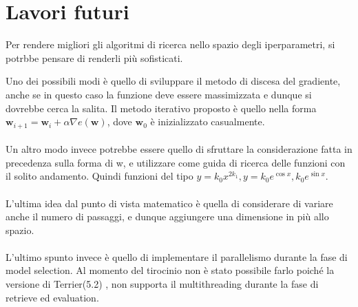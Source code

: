\section{Lavori futuri}
Per rendere migliori gli algoritmi di ricerca nello spazio degli iperparametri, si
potrbbe pensare di renderli più sofisticati.

Uno dei possibili modi è quello di sviluppare il metodo
di discesa del gradiente, anche se in questo caso la funzione
deve essere massimizzata e dunque si dovrebbe cerca la salita.
Il metodo iterativo proposto è quello nella forma
$\boldsymbol{w}_{i+1} = \boldsymbol{w}_{i} + \alpha \nabla e\left(\boldsymbol{w}\right)$,
dove $\boldsymbol{w}_0$ è inizializzato casualmente.
\\
\\
Un altro modo invece potrebbe essere quello di sfruttare la considerazione
fatta in precedenza sulla forma di w, e utilizzare come guida di ricerca delle funzioni
con il solito andamento. Quindi funzioni del tipo $y=k_0 x^{2k_1}, y=k_0e^{\cos x}, k_0e^{\sin x}$.
\\
\\
L'ultima idea dal punto di vista matematico è quella di considerare di variare anche il numero di passaggi, e dunque
aggiungere una dimensione in più allo spazio.
\\
\\
L'ultimo spunto invece è quello di implementare il parallelismo durante la fase di model selection. Al momento
del tirocinio non è stato possibile farlo poiché la versione di Terrier(5.2) , non supporta il multithreading durante
la fase di retrieve ed evaluation.